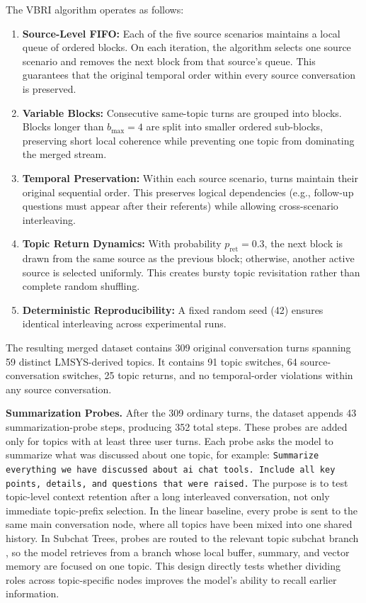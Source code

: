 \documentclass[pdflatex,sn-mathphys-num]{sn-jnl}%
\theoremstyle{thmstyleone}%
\theoremstyle{thmstyletwo}%
\theoremstyle{thmstylethree}%
\begin{document}
The VBRI algorithm operates as follows:
\begin{enumerate}
    \item \textbf{Source-Level FIFO:} Each of the five source scenarios maintains a local queue of ordered blocks. On each iteration, the algorithm selects one source scenario and removes the next block from that source's queue. This guarantees that the original temporal order within every source conversation is preserved.
    \item \textbf{Variable Blocks:} Consecutive same-topic turns are grouped into blocks. Blocks longer than $b_{\max}{=}4$ are split into smaller ordered sub-blocks, preserving short local coherence while preventing one topic from dominating the merged stream.
    \item \textbf{Temporal Preservation:} Within each source scenario, turns maintain their original sequential order. This preserves logical dependencies (e.g., follow-up questions must appear after their referents) while allowing cross-scenario interleaving.
    \item \textbf{Topic Return Dynamics:} With probability $p_{\text{ret}}{=}0.3$, the next block is drawn from the same source as the previous block; otherwise, another active source is selected uniformly. This creates bursty topic revisitation rather than complete random shuffling.
    \item \textbf{Deterministic Reproducibility:} A fixed random seed (42) ensures identical interleaving across experimental runs.
\end{enumerate}

The resulting merged dataset contains 309 original conversation turns spanning 59 distinct LMSYS-derived topics. It contains 91 topic switches, 64 source-conversation switches, 25 topic returns, and no temporal-order violations within any source conversation.

\textbf{Summarization Probes.}
After the 309 ordinary turns, the dataset appends 43 summarization-probe steps, producing 352 total steps. These probes are added only for topics with at least three user turns. Each probe asks the model to summarize what was discussed about one topic, for example: \texttt{Summarize everything we have discussed about ai chat tools. Include all key points, details, and questions that were raised.} The purpose is to test topic-level context retention after a long interleaved conversation, not only immediate topic-prefix selection. In the linear baseline, every probe is sent to the same main conversation node, where all topics have been mixed into one shared history. In Subchat Trees, probes are routed to the relevant topic subchat branch , so the model retrieves from a branch whose local buffer, summary, and vector memory are focused on one topic. This design directly tests whether dividing roles across topic-specific nodes improves the model's ability to recall earlier information.
\end{document}
